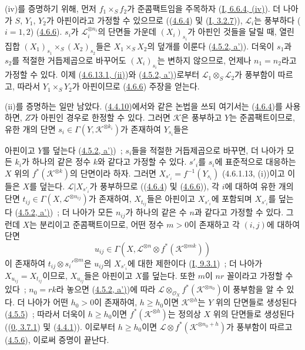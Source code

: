 (iv)를 증명하기 위해, 먼저 $f_1\times_S f_2$가 준콤팩트임을
주목하자 (\hyperref[I.6.6.4-ko]{I, 6.6.4, (iv)}). 더 나아가
$S$, $Y_1$, $Y_2$가 아핀이라고 가정할 수 있으므로
((\hyperref[II.4.6.4-ko]{4.6.4}) 및
(\hyperref[I.3.2.7-ko]{I, 3.2.7})), $\mathcal{L}_i$는 풍부하다
($i=1,2$) (\hyperref[II.4.6.6-ko]{4.6.6}). $s_i$가
$\mathcal{L}_i^{\otimes n_i}$의 단면들 가운데 $(X_i)_{s_i}$가 아핀인
것들을 달릴 때, 열린집합
$(X_1)_{s_1}\times_S(X_2)_{s_2}$들은 $X_1\times_S X_2$의 덮개를
이룬다 (\hyperref[II.4.5.2-ko]{4.5.2, a')}). 더욱이 $s_1$과
$s_2$를 적절한 거듭제곱으로 바꾸어도 $(X_i)_{s_i}$는 변하지 않으므로,
언제나 $n_1=n_2$라고 가정할 수 있다. 이제
(\hyperref[II.4.6.13.1-ko]{4.6.13.1, (ii)})와
(\hyperref[II.4.5.2-ko]{4.5.2, a')})로부터
$\mathcal{L}_1\otimes_S\mathcal{L}_2$가 풍부함이 따르고, 따라서
$Y_1\times_S Y_2$가 아핀이므로
(\hyperref[II.4.6.6-ko]{4.6.6}) 주장을 얻는다.

(ii)를 증명하는 일만 남았다.
(\hyperref[II.4.4.10-ko]{4.4.10})에서와 같은 논법을 쓰되 여기서는
(\hyperref[II.4.6.4-ko]{4.6.4})를 사용하면, $Z$가 아핀인 경우로
한정할 수 있다. 그러면 $\mathcal{K}$은 풍부하고 $Y$는 준콤팩트이므로,
유한 개의 단면
$s_i\in\Gamma(Y,\mathcal{K}^{\otimes k_i})$가 존재하여 $Y_{s_i}$들은


아핀이고 $Y$를 덮는다
(\hyperref[II.4.5.2-ko]{4.5.2, a')})~; $s_i$들을 적절한
거듭제곱으로 바꾸면, 더 나아가 모든 $k_i$가 하나의 같은 정수 $k$와
같다고 가정할 수 있다. $s'_i$를 $s_i$에 표준적으로 대응하는 $X$ 위의
$f^*(\mathcal{K}^{\otimes k})$의 단면이라 하자. 그러면
$X_{s'_i}=f^{-1}(Y_{s_i})$ (4.6.1.13, (i))이고 이들은 $X$를 덮는다.
$\mathcal{L}|X_{s'_i}$가 풍부하므로
((\hyperref[II.4.6.4-ko]{4.6.4}) 및
(\hyperref[II.4.6.6-ko]{4.6.6})), 각 $i$에 대하여 유한 개의 단면
$t_{ij}\in\Gamma(X,\mathcal{L}^{\otimes n_{ij}})$가 존재하여,
$X_{t_{ij}}$들은 아핀이고 $X_{s'_i}$에 포함되며 $X_{s'_i}$를 덮는다
(\hyperref[II.4.5.2-ko]{4.5.2, a')})~; 더 나아가 모든
$n_{ij}$가 하나의 같은 수 $n$과 같다고 가정할 수 있다. 그런데 $X$는
분리이고 준콤팩트이므로, 어떤 정수 $m>0$이 존재하고 각 $(i,j)$에
대하여 단면
\[
  u_{ij}\in\Gamma(X,\mathcal{L}^{\otimes n}\otimes
  f^*(\mathcal{K}^{\otimes mk}))
\]
이 존재하여 $t_{ij}\otimes s_i'^{\otimes m}$은 $u_{ij}$의
$X_{s'_i}$에 대한 제한이다 (\hyperref[I.9.3.1-ko]{I, 9.3.1})~;
더 나아가 $X_{u_{ij}}=X_{t_{ij}}$이므로, $X_{u_{ij}}$들은 아핀이고
$X$를 덮는다. 또한 $m$이 $nr$ 꼴이라고 가정할 수 있다~;
$n_0=rk$라 놓으면
(\hyperref[II.4.5.2-ko]{4.5.2, a')})에 따라
$\mathcal{L}\otimes_{\mathcal{O}_X}f^*(\mathcal{K}^{\otimes n_0})$이
풍부함을 알 수 있다. 더 나아가 어떤 $h_0>0$이 존재하여,
$h\geq h_0$이면 $\mathcal{K}^{\otimes h}$는 $Y$ 위의 단면들로
생성된다 (\hyperref[II.4.5.5-ko]{4.5.5})~; 따라서 더욱이
$h\geq h_0$이면 $f^*(\mathcal{K}^{\otimes h})$는 정의상 $X$ 위의
단면들로 생성된다 ((\hyperref[0.3.7.1-ko]{0, 3.7.1}) 및
(\hyperref[II.4.4.1-ko]{4.4.1})). 이로부터 $h\geq h_0$이면
$\mathcal{L}\otimes f^*(\mathcal{K}^{\otimes n_0+h})$가 풍부함이
따르고 (\hyperref[II.4.5.6-ko]{4.5.6}), 이로써 증명이 끝난다.

